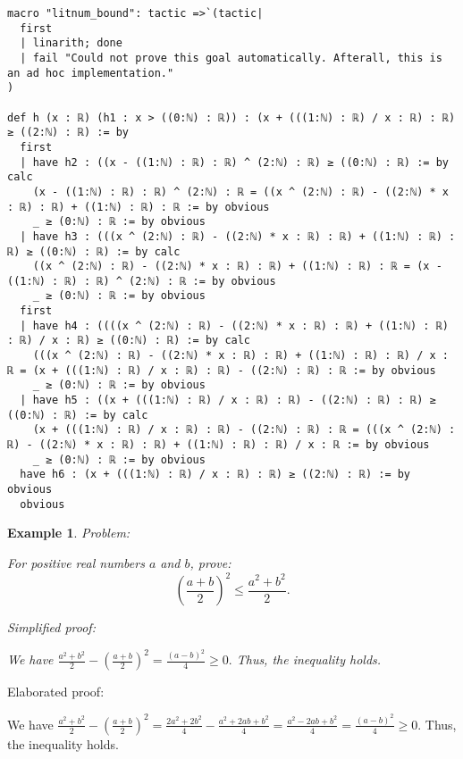 \documentclass{article}
\newtheorem{example}{Example}
\begin{document}
\begin{tcolorbox}[colback=white!10, width=\linewidth]
\begin{lstlisting}[language=Lean4]
macro "litnum_bound": tactic =>`(tactic|
  first
  | linarith; done
  | fail "Could not prove this goal automatically. Afterall, this is an ad hoc implementation."
)

def h (x : ℝ) (h1 : x > ((0:ℕ) : ℝ)) : (x + (((1:ℕ) : ℝ) / x : ℝ) : ℝ) ≥ ((2:ℕ) : ℝ) := by
  first
  | have h2 : ((x - ((1:ℕ) : ℝ) : ℝ) ^ (2:ℕ) : ℝ) ≥ ((0:ℕ) : ℝ) := by calc
    (x - ((1:ℕ) : ℝ) : ℝ) ^ (2:ℕ) : ℝ = ((x ^ (2:ℕ) : ℝ) - ((2:ℕ) * x : ℝ) : ℝ) + ((1:ℕ) : ℝ) : ℝ := by obvious
    _ ≥ (0:ℕ) : ℝ := by obvious
  | have h3 : (((x ^ (2:ℕ) : ℝ) - ((2:ℕ) * x : ℝ) : ℝ) + ((1:ℕ) : ℝ) : ℝ) ≥ ((0:ℕ) : ℝ) := by calc
    ((x ^ (2:ℕ) : ℝ) - ((2:ℕ) * x : ℝ) : ℝ) + ((1:ℕ) : ℝ) : ℝ = (x - ((1:ℕ) : ℝ) : ℝ) ^ (2:ℕ) : ℝ := by obvious
    _ ≥ (0:ℕ) : ℝ := by obvious
  first
  | have h4 : ((((x ^ (2:ℕ) : ℝ) - ((2:ℕ) * x : ℝ) : ℝ) + ((1:ℕ) : ℝ) : ℝ) / x : ℝ) ≥ ((0:ℕ) : ℝ) := by calc
    (((x ^ (2:ℕ) : ℝ) - ((2:ℕ) * x : ℝ) : ℝ) + ((1:ℕ) : ℝ) : ℝ) / x : ℝ = (x + (((1:ℕ) : ℝ) / x : ℝ) : ℝ) - ((2:ℕ) : ℝ) : ℝ := by obvious
    _ ≥ (0:ℕ) : ℝ := by obvious
  | have h5 : ((x + (((1:ℕ) : ℝ) / x : ℝ) : ℝ) - ((2:ℕ) : ℝ) : ℝ) ≥ ((0:ℕ) : ℝ) := by calc
    (x + (((1:ℕ) : ℝ) / x : ℝ) : ℝ) - ((2:ℕ) : ℝ) : ℝ = (((x ^ (2:ℕ) : ℝ) - ((2:ℕ) * x : ℝ) : ℝ) + ((1:ℕ) : ℝ) : ℝ) / x : ℝ := by obvious
    _ ≥ (0:ℕ) : ℝ := by obvious
  have h6 : (x + (((1:ℕ) : ℝ) / x : ℝ) : ℝ) ≥ ((2:ℕ) : ℝ) := by obvious
  obvious

\end{lstlisting}
\end{tcolorbox}


\begin{example}
Problem:
\begin{tcolorbox}[colback=yellow!10, width=\linewidth]
For positive real numbers $a$ and $b$, prove:
    $$\left(\frac{a+b}{2}\right)^2 \leq \frac{a^2+b^2}{2}.$$
\end{tcolorbox}

Simplified proof:
\begin{tcolorbox}[colback=blue!10, width=\linewidth]
We have
$ \frac{a^2+b^2}{2} - \left(\frac{a+b}{2}\right)^2 = \frac{(a-b)^2}{4} \ge 0. $
Thus, the inequality holds.
\end{tcolorbox}
\end{example}

Elaborated proof:
\begin{tcolorbox}[colback=green!10, width=\linewidth]
We have
$ \frac{a^2+b^2}{2} - \left(\frac{a+b}{2}\right)^2 = \frac{2a^2+2b^2}{4} - \frac{a^2+2ab+b^2}{4} = \frac{a^2-2ab+b^2}{4} = \frac{(a-b)^2}{4} \ge 0. $
Thus, the inequality holds.
\end{tcolorbox}
\end{document}
